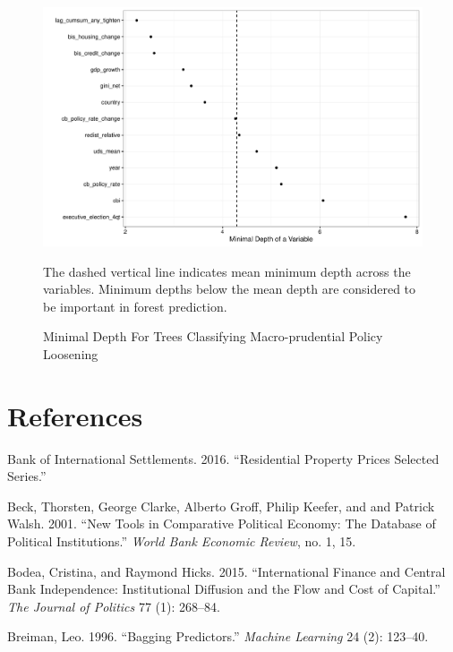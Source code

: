 \documentclass[]{article}
\begin{document}
\begin{figure}
    \caption{Minimal Depth For Trees Classifying Macro-prudential Policy Loosening}
    \label{depth_loosen}
    \begin{center}
        \includegraphics{figures/loosen_md.pdf}
    \end{center}

    {\scriptsize{The dashed vertical line indicates mean minimum depth across the variables. Minimum depths below the mean depth are considered to be important in forest prediction.}}

\end{figure}

\clearpage

\section*{References}\label{references}

\hypertarget{refs}{}
\hypertarget{ref-bis2016}{}
Bank of International Settlements. 2016. ``Residential Property Prices
Selected Series.''

\hypertarget{ref-DPI2001}{}
Beck, Thorsten, George Clarke, Alberto Groff, Philip Keefer, and and
Patrick Walsh. 2001. ``New Tools in Comparative Political Economy: The
Database of Political Institutions.'' \emph{World Bank Economic Review},
no. 1, 15.

\hypertarget{ref-Bodea2015}{}
Bodea, Cristina, and Raymond Hicks. 2015. ``International Finance and
Central Bank Independence: Institutional Diffusion and the Flow and Cost
of Capital.'' \emph{The Journal of Politics} 77 (1): 268--84.

\hypertarget{ref-Breiman1996}{}
Breiman, Leo. 1996. ``Bagging Predictors.'' \emph{Machine Learning} 24
(2): 123--40.
\end{document}
